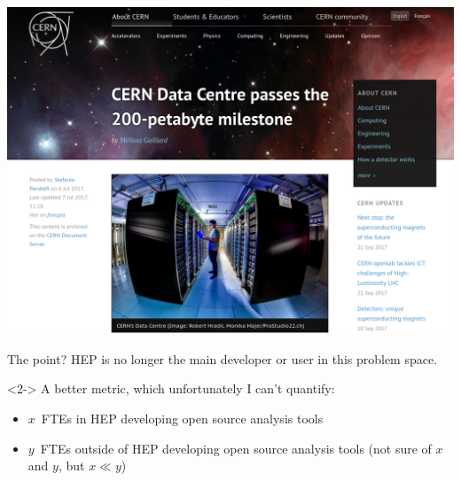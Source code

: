 \documentclass[aspectratio=169]{beamer}
\begin{document}
\begin{frame}{}
\vspace{0.35 cm}
\includegraphics[width=0.73\linewidth]{cern-200pb.png}

\vspace{-4.8 cm}
\end{frame}

\begin{frame}{The point?}
\Large
\vspace{0.5 cm}
HEP is no longer the main developer or user in this problem space.

\vspace{0.5 cm}
\begin{uncoverenv}<2->
A better metric, which unfortunately I can't quantify:
\begin{itemize}
\item $x$~FTEs in HEP developing open source analysis tools
\item $y$~FTEs outside of HEP developing open source analysis tools
(not sure of $x$ and $y$, but $x \ll y$)
\end{itemize}
\end{uncoverenv}

\vspace{0.5 cm}



\mbox{ }
\end{frame}
\end{document}
